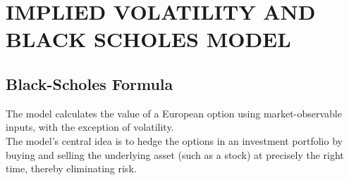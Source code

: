 \documentclass[a4 paper, 12pt]{report}
\theoremstyle{plain}
\begin{document}

\chapter{IMPLIED VOLATILITY AND BLACK SCHOLES MODEL}
\section{Black-Scholes Formula}
\noindent

\par The model calculates the value of a European option using market-observable inputs, with the exception of volatility.\\
The model's central idea is to hedge the options in an investment portfolio by buying and selling the underlying asset (such as a stock) at precisely the right time, thereby eliminating risk.
\end{document}
